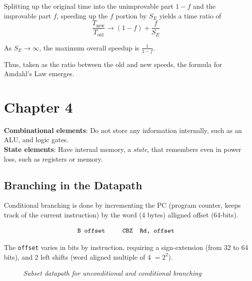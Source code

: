 \documentclass[11pt]{article}
\begin{document}
Splitting up the original time into the unimprovable part $1-f$ and the improvable part $f$, speeding up the $f$ portion by $S_E$ yields a time ratio of $$\frac{T_\text{new}}{T_\text{old}}\rightarrow (1-f) + \frac{f}{S_E}$$

As $S_E \rightarrow \infty$, the maximum overall speedup is $\frac{1}{1-f}$.

Thus, taken as the ratio between the old and new speeds, the formula for Amdahl's Law emerges.

\pagebreak

\section*{Chapter 4}

\begin{tcolorbox}[
    enhanced,
    attach boxed title to top left={xshift=6mm,yshift=-1.5mm},
    colback=moonstoneblue!20,
    colframe=moonstoneblue,
    colbacktitle=moonstoneblue,
    title=Logic Design Elements,
    fonttitle=\bfseries\color{white},
    boxed title style={size=small,colframe=moonstoneblue,sharp corners},
    sharp corners,
    label=box:logic-types,
]
    {\color{moondark}\textbf{Combinational elements}}: Do not store any information internally, such as an ALU, and logic gates. \\
    {\color{moondark}\textbf{State elements}}: Have internal memory, a \textit{state}, that remembers even in power loss, such as registers or memory.
\end{tcolorbox}

\subsection*{Branching in the Datapath}

Conditional branching is done by incrementing the PC (program counter, keeps track of the current instruction) by the word (4 bytes) alligned offset (64-bits).

\vspace{-1em}
$$\texttt{B offset \quad \quad CBZ \ Rd, offset}$$

The \texttt{offset} varies in bits by instruction, requiring a sign-extension (from 32 to 64 bits), and 2 left shifts (word aligned multiple of 4 $=2^2$).

\begin{figure}[htbp]
    \centering
    \caption{\textit{Subset datapath for unconditional and conditional branching}}
    \label{fig:data-branch}
\end{figure}
\end{document}
